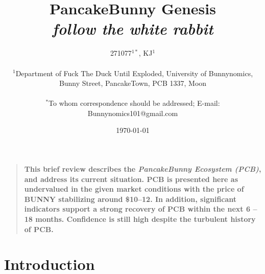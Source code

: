 \documentclass[12pt]{article}
\title{PancakeBunny Genesis \\ {\it follow the white rabbit\/} }
\author
{271077$^{1\ast}$, KJ$^{1}$\\
\\
\normalsize{$^{1}$Department of Fuck The Duck Until Exploded, University of Bunnynomics,}\\
\normalsize{Bunny Street, PancakeTown, PCB 1337, Moon}\\
\\
\normalsize{$^\ast$To whom correspondence should be addressed; E-mail:  Bunnynomics101@gmail.com}
\\
\date{\today}
}
\date{}
\newenvironment{sciabstract}{%
\begin{quote} \bf}
{\end{quote}}
\begin{document}
 


\baselineskip24pt


\maketitle 




\begin{sciabstract}
  This brief review describes the {\it PancakeBunny Ecosystem (PCB)\/}, and address its current situation. 
  PCB is presented here as undervalued in the given market conditions with the price of BUNNY stabilizing around \$10–12.
  In addition, significant indicators support a strong recovery of PCB within the next 6 – 18 months. 
 Confidence is still high despite the turbulent history of PCB.
\end{sciabstract}




\section*{Introduction}
\end{document}
